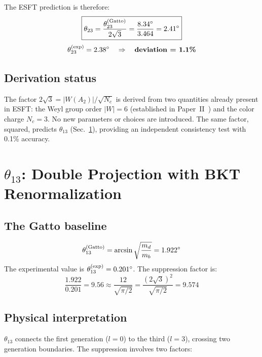 ﻿\documentclass[prd,twocolumn,showpacs,superscriptaddress,groupedaddress]{revtex4-2}
\begin{document}
The ESFT prediction is therefore:
\begin{equation}
\boxed{\theta_{23} = \frac{\theta_{23}^{(\rm Gatto)}}{2\sqrt{3}} = \frac{8.34^\circ}{3.464} = 2.41^\circ}
\end{equation}
\begin{equation}
\theta_{23}^{(\rm exp)} = 2.38^\circ \quad \Rightarrow \quad \textbf{deviation = 1.1\%}
\end{equation}

\subsection{Derivation status}

The factor $2\sqrt{3} = |W(A_2)|/\sqrt{N_c}$ is derived from two quantities already present in ESFT: the Weyl group order $|W| = 6$ (established in Paper~II~\cite{Paper2}) and the color charge $N_c = 3$. No new parameters or choices are introduced. The same factor, squared, predicts $\theta_{13}$ (Sec.~\ref{sec:theta13}), providing an independent consistency test with 0.1\% accuracy.

\section{$\theta_{13}$: Double Projection with BKT Renormalization}
\label{sec:theta13}

\subsection{The Gatto baseline}

\begin{equation}
\theta_{13}^{(\rm Gatto)} = \arcsin\sqrt{\frac{m_d}{m_b}} = 1.922^\circ
\end{equation}
The experimental value is $\theta_{13}^{(\rm exp)} = 0.201^\circ$. The suppression factor is:
\begin{equation}
\frac{1.922}{0.201} = 9.56 \approx \frac{12}{\sqrt{\pi/2}} = \frac{(2\sqrt{3})^2}{\sqrt{\pi/2}} = 9.574
\end{equation}

\subsection{Physical interpretation}

$\theta_{13}$ connects the first generation ($l = 0$) to the third ($l = 3$), crossing two generation boundaries. The suppression involves two factors:
\end{document}
